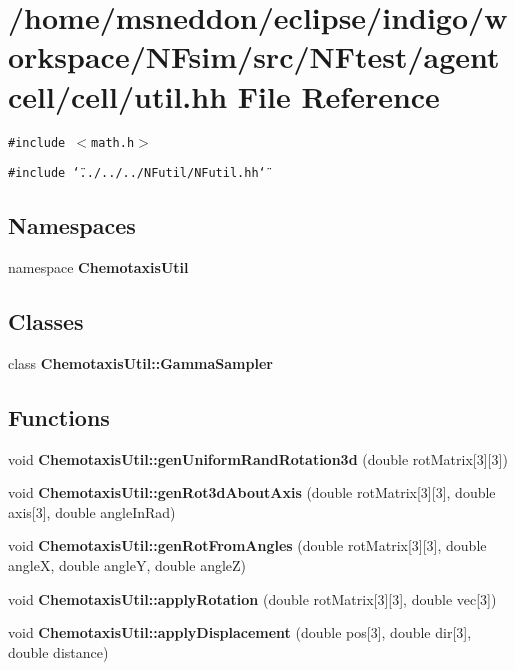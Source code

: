 \section{/home/msneddon/eclipse/indigo/workspace/NFsim/src/NFtest/agentcell/cell/util.hh File Reference}
\label{util_8hh}


{\tt \#include $<$math.h$>$}\par
{\tt \#include \char`\"{}../../../NFutil/NFutil.hh\char`\"{}}\par
\subsection*{Namespaces}
\begin{CompactItemize}
\item 
namespace {\bf ChemotaxisUtil}
\end{CompactItemize}
\subsection*{Classes}
\begin{CompactItemize}
\item 
class {\bf ChemotaxisUtil::GammaSampler}
\end{CompactItemize}
\subsection*{Functions}
\begin{CompactItemize}
\item 
void {\bf ChemotaxisUtil::genUniformRandRotation3d} (double rotMatrix[3][3])
\item 
void {\bf ChemotaxisUtil::genRot3dAboutAxis} (double rotMatrix[3][3], double axis[3], double angleInRad)
\item 
void {\bf ChemotaxisUtil::genRotFromAngles} (double rotMatrix[3][3], double angleX, double angleY, double angleZ)
\item 
void {\bf ChemotaxisUtil::applyRotation} (double rotMatrix[3][3], double vec[3])
\item 
void {\bf ChemotaxisUtil::applyDisplacement} (double pos[3], double dir[3], double distance)
\end{CompactItemize}

